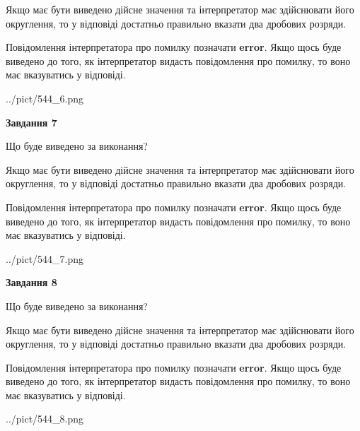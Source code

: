 \documentclass[12pt, ukrainian]{article}
\begin{document}
{\begin {Large}
Якщо має бути виведено дійсне значення та інтерпретатор має здійснювати його округлення, 
то у відповіді достатньо правильно вказати два дробових розряди.

Повідомлення інтерпретатора про помилку позначати \textbf{error}.
Якщо щось буде виведено до того, як інтерпретатор видасть повідомлення про помилку, 
то воно має вказуватись у відповіді. \par

\begin{center}
	{../pict/544_6.png}
\end{center}
\newpage

{\begin {center}\textbf{Завдання 7}\end {center}}\par
Що буде виведено за виконання? \par

Якщо має бути виведено дійсне значення та інтерпретатор має здійснювати його округлення, 
то у відповіді достатньо правильно вказати два дробових розряди.

Повідомлення інтерпретатора про помилку позначати \textbf{error}.
Якщо щось буде виведено до того, як інтерпретатор видасть повідомлення про помилку, 
то воно має вказуватись у відповіді. \par

\begin{center}
	{../pict/544_7.png}
\end{center}
\newpage

{\begin {center}\textbf{Завдання 8}\end {center}}\par
Що буде виведено за виконання? \par

Якщо має бути виведено дійсне значення та інтерпретатор має здійснювати його округлення, 
то у відповіді достатньо правильно вказати два дробових розряди.

Повідомлення інтерпретатора про помилку позначати \textbf{error}.
Якщо щось буде виведено до того, як інтерпретатор видасть повідомлення про помилку, 
то воно має вказуватись у відповіді. \par

\begin{center}
	{../pict/544_8.png}
\end{center}
\newpage


\end{Large}}
\end{document}

